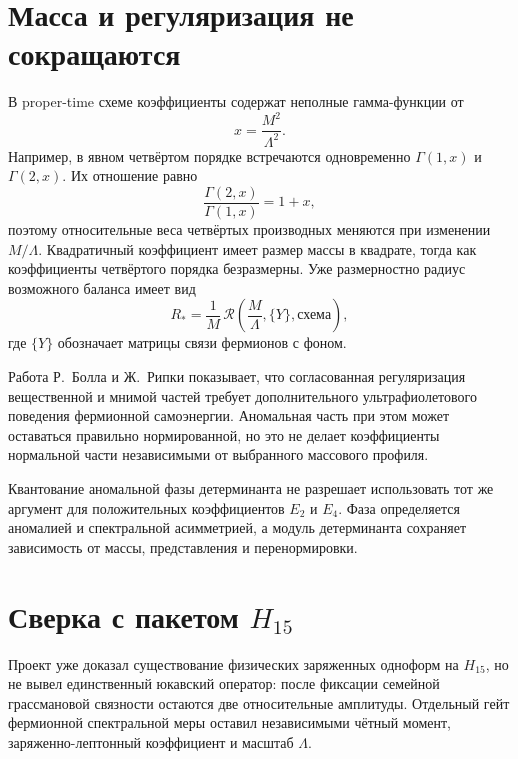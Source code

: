 \section{Масса и регуляризация не сокращаются}

В proper-time схеме коэффициенты содержат неполные гамма-функции от
\begin{equation}
 x=\frac{M^2}{\Lambda^2}.
\end{equation}
Например, в явном четвёртом порядке встречаются одновременно
$\Gamma(1,x)$ и $\Gamma(2,x)$. Их отношение равно
\begin{equation}
 \frac{\Gamma(2,x)}{\Gamma(1,x)}=1+x,
 \label{eq:v5-incomplete-gamma-ratio}
\end{equation}
поэтому относительные веса четвёртых производных меняются при изменении
$M/\Lambda$. Квадратичный коэффициент имеет размер массы в квадрате,
тогда как коэффициенты четвёртого порядка безразмерны. Уже размерностно
радиус возможного баланса имеет вид
\begin{equation}
 R_*=\frac1M\,
 \mathcal R\!\left(\frac{M}{\Lambda},\{Y\},\text{схема}\right),
 \label{eq:v5-fermion-induced-radius}
\end{equation}
где $\{Y\}$ обозначает матрицы связи фермионов с фоном.

Работа Р.~Болла и Ж.~Рипки  показывает, что
согласованная регуляризация вещественной и мнимой частей требует
дополнительного ультрафиолетового поведения фермионной самоэнергии.
Аномальная часть при этом может оставаться правильно нормированной, но
это не делает коэффициенты нормальной части независимыми от выбранного
массового профиля.

\begin{nogocriterion}
Квантование аномальной фазы детерминанта не разрешает использовать тот же
аргумент для положительных коэффициентов $E_2$ и $E_4$. Фаза определяется
аномалией и спектральной асимметрией, а модуль детерминанта сохраняет
зависимость от массы, представления и перенормировки.
\end{nogocriterion}

\section{Сверка с пакетом \texorpdfstring{$H_{15}$}{H15}}

Проект уже доказал существование физических заряженных одноформ на
$H_{15}$, но не вывел единственный юкавский оператор: после фиксации
семейной грассмановой связности остаются две относительные амплитуды.
Отдельный гейт фермионной спектральной меры оставил независимыми чётный
момент, заряженно-лептонный коэффициент и масштаб $\Lambda$.

